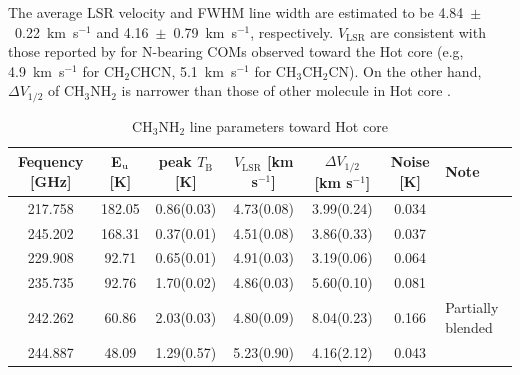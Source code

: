The average LSR velocity and FWHM line width are estimated to be 4.84~$\pm$~0.22~km~s$^{-1}$ and 
4.16~$\pm$~0.79~km~s$^{-1}$, respectively.
 $V_{\mathrm{LSR}}$ are consistent with those reported by \citet{Feng+2015} 
 for N-bearing COMs observed toward the Hot core
 (e.g, 4.9~km~s$^{-1}$ for CH$_2$CHCN, 5.1~km~s$^{-1}$ for CH$_3$CH$_2$CN).
On the other hand, $\Delta V_{1/2}$ of CH$_3$NH$_2$ is narrower than those of other molecule in Hot core
\citep[typically 5--15~km~s$^{-1}$,][]{Pagani+2017}.

\renewcommand{\arraystretch}{1.5}
\begin{table}[htb]
\begin{center}

  \caption{CH$_3$NH$_2$ line parameters toward Hot core}
  \label{tab:paraOri}
{\scriptsize
  \begin{tabular}{ccccccl} \hline
   Fequency [GHz]& E$_{\rm{u}}$ [K] &  peak $T_{\mathrm{B}}$ [K] & $V_{\mathrm{LSR}}$ [km s$^{-1}$] & $\Delta V_{1/2}$ [km s$^{-1}$] & Noise [K]  & Note \\ \hline 
    217.758  & 182.05 &  0.86(0.03) & 4.73(0.08) & 3.99(0.24) & 0.034 & \\
    245.202 & 168.31 & 0.37(0.01) & 4.51(0.08) & 3.86(0.33) & 0.037 & \\
    229.908  & 92.71 &  0.65(0.01) & 4.91(0.03) & 3.19(0.06)& 0.064&\\ 
    235.735  & 92.76 & 1.70(0.02) & 4.86(0.03) & 5.60(0.10)& 0.081 & \\
    242.262  & 60.86 &  2.03(0.03) & 4.80(0.09) & 8.04(0.23) & 0.166 & Partially blended \\
    244.887  & 48.09 & 1.29(0.57)& 5.23(0.90) & 4.16(2.12) & 0.043 & \\ \hline
  \end{tabular}
  }
\end{center}
\end{table}


